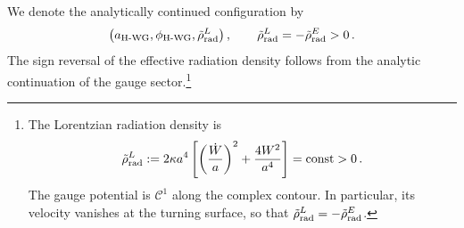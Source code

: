 \documentclass[a4paper,11pt]{article}
\begin{document}
We denote the analytically continued configuration by
\begin{equation}
\left( a_{\rm H\text{-}WG},
\phi_{\rm H\text{-}WG},
\tilde{\rho}_{\rm rad}^{L} \right), \qquad \tilde{\rho}_{\rm rad}^{L} = -\tilde{\rho}_{\rm rad}^{E}>0\,.
\end{equation}
The sign reversal of the effective radiation density follows from the analytic continuation of the gauge sector.\footnote{
The Lorentzian radiation density is
\begin{equation}
    \tilde{\rho}_{\rm rad}^{L}:= 2\kappa a^4 \left[
  \left(\frac{\dot{W}}{a}\right)^2  +\frac{4W^2}{a^4}
    \right] = {\rm const}>0\,.
\end{equation}
The gauge potential is $\mathcal{C}^1$ along the complex contour. In particular, its velocity vanishes at the turning surface, so that
$\tilde{\rho}_{\rm rad}^{L}
=-\tilde{\rho}_{\rm rad}^{E}$.
}
\end{document}

